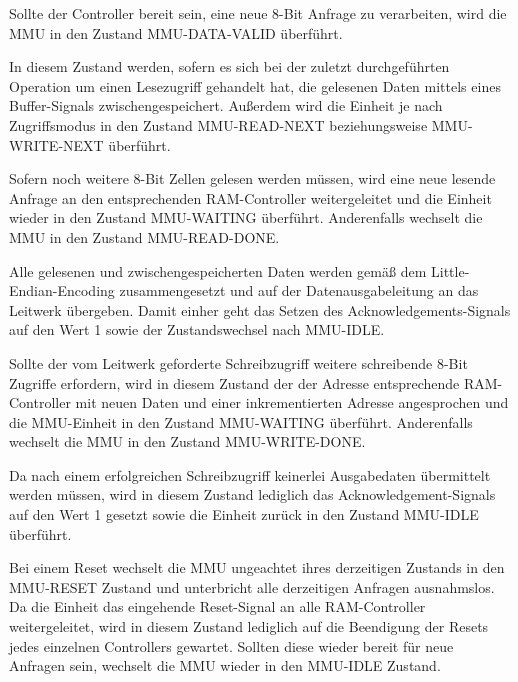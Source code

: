 Sollte der Controller bereit sein, eine neue 8-Bit Anfrage zu verarbeiten, wird die MMU in den Zustand MMU-DATA-VALID \"uberf\"uhrt.

In diesem Zustand werden, sofern es sich bei der zuletzt durchgef\"uhrten Operation um einen Lesezugriff gehandelt hat, die gelesenen Daten mittels eines Buffer-Signals zwischengespeichert. Au\ss{}erdem wird die Einheit je nach Zugriffsmodus in den Zustand MMU-READ-NEXT beziehungsweise MMU-WRITE-NEXT \"uberf\"uhrt.


Sofern noch weitere 8-Bit Zellen gelesen werden m\"ussen, wird eine neue lesende Anfrage an den entsprechenden RAM-Controller weitergeleitet und  die Einheit wieder in den Zustand MMU-WAITING \"uberf\"uhrt. Anderenfalls wechselt die MMU in den Zustand MMU-READ-DONE.


Alle gelesenen und zwischengespeicherten Daten werden gem\"a\ss{} dem Little-Endian-Encoding zusammengesetzt und auf der Datenausgabeleitung an das Leitwerk \"ubergeben. Damit einher geht das Setzen des Acknowledgements-Signals  auf den Wert 1 sowie der Zustandswechsel nach MMU-IDLE.


Sollte der vom Leitwerk geforderte Schreibzugriff weitere schreibende 8-Bit Zugriffe erfordern, wird in diesem Zustand der der Adresse entsprechende RAM-Controller mit neuen Daten und einer inkrementierten Adresse angesprochen und die MMU-Einheit in den Zustand MMU-WAITING \"uberf\"uhrt. Anderenfalls wechselt die MMU in den Zustand MMU-WRITE-DONE.


Da nach einem erfolgreichen Schreibzugriff keinerlei Ausgabedaten \"ubermittelt werden m\"ussen, wird in diesem Zustand lediglich das Acknowledgement-Signals  auf den Wert 1 gesetzt sowie die Einheit zur\"uck in den Zustand MMU-IDLE \"uberf\"uhrt.


Bei einem Reset wechselt die MMU ungeachtet ihres derzeitigen Zustands in den MMU-RESET Zustand und unterbricht alle derzeitigen Anfragen ausnahmslos. Da die Einheit das eingehende Reset-Signal an alle RAM-Controller weitergeleitet, wird in diesem Zustand lediglich auf  die Beendigung der Resets jedes einzelnen Controllers gewartet. Sollten diese wieder bereit f\"ur neue Anfragen sein, wechselt die MMU wieder in den MMU-IDLE Zustand.

